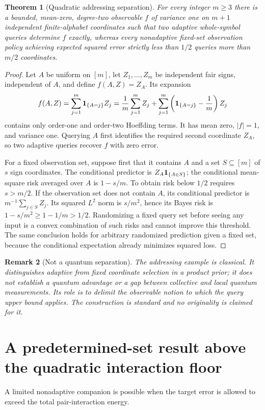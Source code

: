 \documentclass[11pt,letterpaper]{article}
\newtheorem{theorem}{Theorem}[section]
\newtheorem{remark}[theorem]{Remark}
\theoremstyle{definition}
\begin{document}
\begin{theorem}[Quadratic addressing separation]\label{thm:address}
For every integer $m\ge3$ there is a bounded, mean-zero, degree-two
observable $f$ of variance one on $m+1$ independent finite-alphabet
coordinates such that two adaptive whole-symbol queries determine $f$
exactly, whereas every nonadaptive fixed-set observation policy achieving
expected squared error strictly less than $1/2$ queries more than $m/2$
coordinates.
\end{theorem}
\begin{proof}
Let $A$ be uniform on $[m]$, let $Z_1,\ldots,Z_m$ be independent fair
signs, independent of $A$, and define $f(A,Z)=Z_A$. Its expansion
\begin{equation}\label{eq:address}
f(A,Z)=\sum_{j=1}^m{\bf1}_{\{A=j\}}Z_j
=\frac1m\sum_{j=1}^mZ_j+\sum_{j=1}^m
\left({\bf1}_{\{A=j\}}-\frac1m\right)Z_j
\end{equation}
contains only order-one and order-two Hoeffding terms. It has mean zero,
$|f|=1$, and variance one. Querying $A$ first identifies the required
second coordinate $Z_A$, so two adaptive queries recover $f$ with zero
error.

For a fixed observation set, suppose first that it contains $A$ and a
set $S\subseteq[m]$ of $s$ sign coordinates. The conditional predictor
is $Z_A{\bf1}_{\{A\in S\}}$; the conditional mean-square risk averaged
over $A$ is $1-s/m$. To obtain risk below $1/2$ requires $s>m/2$.
If the observation set does not contain $A$, its conditional predictor
is $m^{-1}\sum_{j\in S}Z_j$. Its squared $L^2$ norm is $s/m^2$, hence its
Bayes risk is $1-s/m^2\ge1-1/m>1/2$. Randomizing a fixed query set before
seeing any input is a convex combination of such risks and cannot improve
this threshold. The same conclusion holds for arbitrary randomized
prediction given a fixed set, because the conditional expectation already
minimizes squared loss.
\end{proof}

\begin{remark}[Not a quantum separation]
The addressing example is classical. It distinguishes adaptive from fixed
coordinate selection in a product prior; it does not establish a quantum
advantage or a gap between collective and local quantum measurements. Its
role is to delimit the observable notion to which the query upper bound
applies. The construction is standard and no originality is claimed for it.
\end{remark}

\section{A predetermined-set result above the quadratic interaction floor}\label{sec:fixed}
A limited nonadaptive companion is possible when the target error is
allowed to exceed the total pair-interaction energy.
\end{document}
